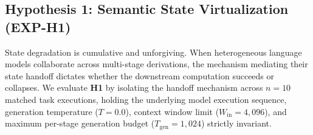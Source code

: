 \subsection{Hypothesis 1: Semantic State Virtualization (EXP-H1)}
\label{sec:results_h1}

State degradation is cumulative and unforgiving. When heterogeneous language models collaborate across multi-stage derivations, the mechanism mediating their state handoff dictates whether the downstream computation succeeds or collapses. We evaluate \textbf{H1} by isolating the handoff mechanism across $n=10$ matched task executions, holding the underlying model execution sequence, generation temperature ($T=0.0$), context window limit ($W_{\text{in}} = 4,096$), and maximum per-stage generation budget ($T_{\text{gen}} = 1,024$) strictly invariant.

